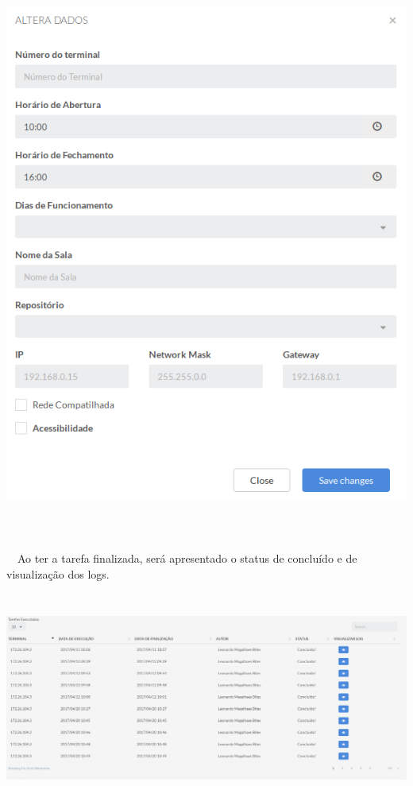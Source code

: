         \begin{center}
        \includegraphics[width=15.279cm,height=18.83cm]{figuras/RATCETECATMSTFLS051718v2-img006.png}
        \end{center}

        \bigskip


        \bigskip


        \bigskip

{\color{black}
    \ \ Ao ter a tarefa finalizada, ser\'a apresentado o status de conclu\'ido e de visualiza\c{c}\~ao dos logs.}

    \begin{center}
    \includegraphics[width=17.029cm,height=6.969cm]{figuras/RATCETECATMSTFLS051718v2-img007.png}
    \end{center}

